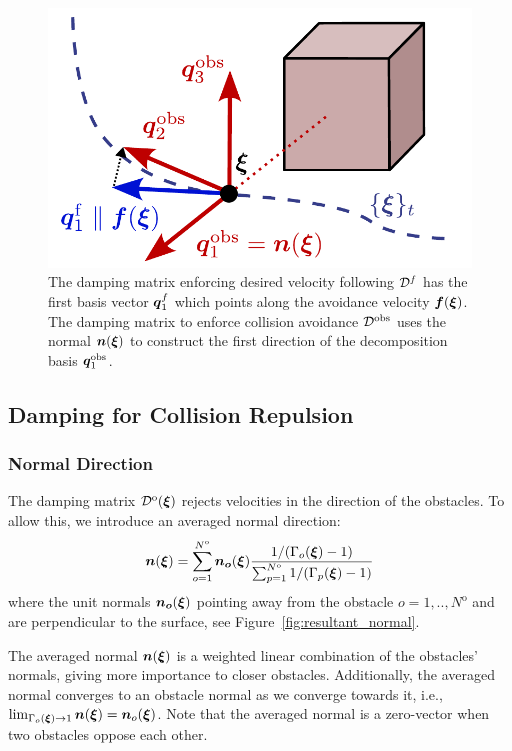 \begin{figure}
  \center
  \includegraphics[width=0.7\columnwidth]{figures/damping_basis_construction.pdf}
\caption{The damping matrix enforcing desired velocity following $\mathcal{D}^{f}$ has the first basis vector $\boldsymbol{q}_1^{f}$ which points along the avoidance velocity $\boldsymbol{f}(\boldsymbol{\xi})$. The damping matrix to enforce collision avoidance $\mathcal{D}^{\mathrm{obs}}$ uses the normal $\boldsymbol{n}(\boldsymbol{\xi})$ to construct the first direction of the decomposition basis $\boldsymbol{q}^{\mathrm{obs}}_1$.}
\label{fig:damping_basis_construction}
\end{figure}

\subsection{Damping for Collision Repulsion} \label{sec:obstacle_repulsion}

\subsubsection{Normal Direction}
The damping matrix $\mathcal{D}^{\mathrm{o}}(\boldsymbol{\xi})$ rejects velocities in the direction of the obstacles. To allow this, we introduce an averaged normal direction:
\begin{equation}
  \vecs n(\vecs\xi) = \sum_{o=1}^{N^{\mathrm{o}}} \vecs{n_o}(\vecs\xi)
  \frac{1 / (\Gamma_o(\vecs \xi) - 1)}{\sum_{p=1}^{N^\mathrm{o}} 1 / (\Gamma_p(\vecs \xi) - 1)}
  \label{eq:averaged_normal}
\end{equation}
 where the unit normals $\boldsymbol{n_o} (\boldsymbol{\xi})$ pointing away from the obstacle $o = 1,  ..,  N^{\mathrm{o}}$ and are perpendicular to the surface, see Figure~\ref{fig:resultant_normal}. 

The averaged normal $\boldsymbol{n}(\boldsymbol{\xi})$ is a weighted linear combination of the obstacles' normals, giving more importance to closer obstacles.
Additionally, the averaged normal converges to an obstacle normal as we converge towards it, i.e., $\lim_{\Gamma_o(\boldsymbol{\xi}) \rightarrow 1} \boldsymbol{n}(\boldsymbol{\xi}) = \boldsymbol{n}_o(\boldsymbol{\xi})$.
Note that the averaged normal is a zero-vector when two obstacles oppose each other. 

